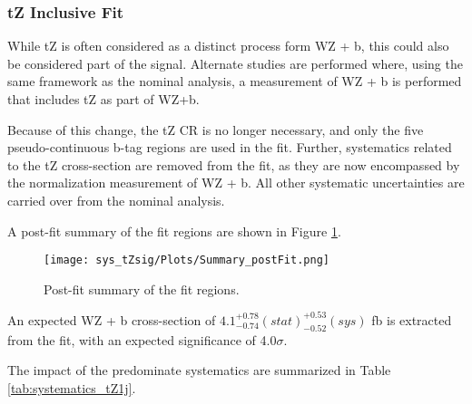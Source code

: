 
\subsubsection{tZ Inclusive Fit}
\label{sec:inc_tZ}

While tZ is often considered as a distinct process form WZ + b, this could also be considered part of the signal. Alternate studies are performed where, using the same framework as the nominal analysis, a measurement of WZ + b is performed that includes tZ as part of WZ+b. 

Because of this change, the tZ CR is no longer necessary, and only the five pseudo-continuous b-tag regions are used in the fit. Further, systematics related to the tZ cross-section are removed from the fit, as they are now encompassed by the normalization measurement of WZ + b. All other systematic uncertainties are carried over from the nominal analysis.

A post-fit summary of the fit regions are shown in Figure \ref{fig:tZ_inc_1j}.

\begin{figure}[H]
  \center
  \texttt{[image: sys\_tZsig/Plots/Summary\_postFit.png]}
  \caption{Post-fit summary of the fit regions.}
  \label{fig:tZ_inc_1j}
\end{figure}

An expected WZ + b cross-section of $4.1^{+0.78}_{-0.74} (stat)^{+0.53}_{-0.52}(sys)$ fb is extracted from the fit, with an expected significance of 4.0$\sigma$.

The impact of the predominate systematics are summarized in Table \ref{tab:systematics_tZ1j}.

